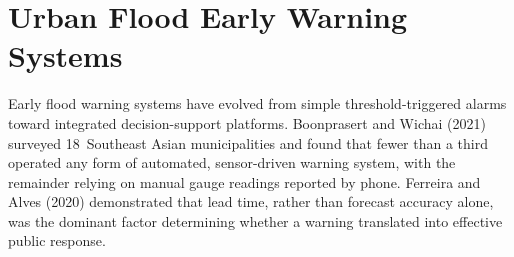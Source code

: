 \section{Urban Flood Early Warning Systems}
Early flood warning systems have evolved from simple threshold-triggered alarms toward integrated decision-support platforms. Boonprasert and Wichai (2021) surveyed 18~Southeast Asian municipalities and found that fewer than a third operated any form of automated, sensor-driven warning system, with the remainder relying on manual gauge readings reported by phone. Ferreira and Alves (2020) demonstrated that lead time, rather than forecast accuracy alone, was the dominant factor determining whether a warning translated into effective public response.
